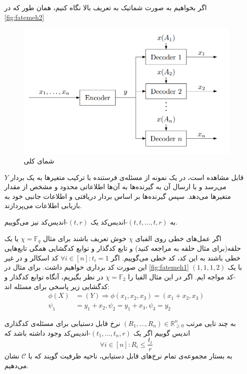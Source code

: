 اگر بخواهیم به صورت شماتیک به تعریف بالا نگاه کنیم، همان طور که در
\autoref{fig:fatemeh2}
\begin{figure}[b!]
	\centering
	\includegraphics[width=0.7\linewidth]{figs/chapter1/fatemeh2}
	\caption[
		شمای کلی 
	\icod
	]{
		شمای کلی 
		\icod
	\cite{fatemehbook}
	}
	\label{fig:fatemeh2}
\end{figure}
قابل مشاهده است، در یک نمونه از مسئله‌ی
\icod
فرستنده با ترکیب متغیرها به یک بردار
$Y$
می‌رسد و با ارسال آن به گیرنده‌ها به آن‌ها اطلاعاتی محدود و مشخص از مقدار متغیرها می‌دهد. سپس گیرنده‌ها بر اساس بردار دریافتی و اطلاعات جانبی خود به بازیابی اطلاعات می‌پردازند.

	به 
	$(t, t, \ldots, t, r)$-اندیس‌کد
	یک
	$(t, r)$-اندیس‌کد
	نیز می‌گوییم.
	
	اگر عمل‌های خطی روی الفبای
	$\chi$
	خوش تعریف باشند برای مثال
	$\chi = \mathbb{F}_q$
	یا یک حلقه(برای مثال حلقه به 
	\cite{Connelly2018}
	مراجعه کنید) و تابع کدگذار و توابع کدگشایی همگی تابع‌هایی خطی باشند به این کد، کد خطی می‌گوییم. اگر 
	$\forall i \in [n]: t_i = 1$
	کد اسکالر و در غیر این صورت کد برداری خواهیم داشت. برای مثال در 
	\autoref{fig:fatemeh1}
	با یک 
	$(1, 1, 1, 2)$-کد
	مواجه ایم. اگر در این مثال الفبا را
	$\chi = \mathbb{F}_2$
	در نظر بگیریم، آنگاه توابع کدگذار و کدگشایی زیر پاسخی برای مسئله اند:
	\begin{align*}
	\phi(X) &= (Y) \Rightarrow \phi(x_1, x_2, x_3) = (x_1 + x_2, x_3) \\
	\psi_1 &= y_1 + x_2, \psi_2 = y_1 + x_3, \psi_3 = y_2
	\end{align*}
	\begin{definition}
		به چند تایی مرتب
		$(R_1, \ldots, R_n) \in \mathbb{R}_{\geqslant 0}^n$
		نرخ قابل دستیابی برای مسئله‌ی کدگذاری اندیس گوییم اگر یک 
		$(t_1, \ldots, t_n, r)$-اندیس‌کد
		 وجود داشته باشد که
		$$\forall i \in [n]: R_i \leq \frac{t_i}{r}$$
		به بستار مجموعه‌ی تمام نرخ‌های قابل دستیابی، ناحیه ظرفیت گویند که با
		$\mathscr{C}$
		نشان می‌دهیم.
	\end{definition}
	
